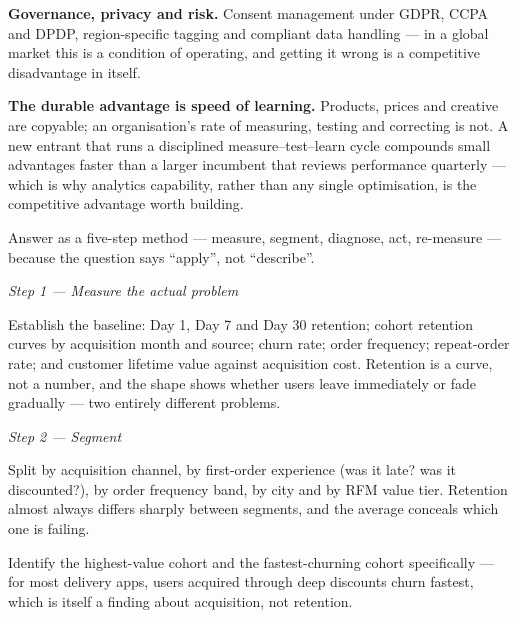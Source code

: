 \begin{qlist}
\begin{apts}
\item \textbf{Governance, privacy and risk.} Consent management under GDPR,
      CCPA and DPDP, region-specific tagging and compliant data handling --- in
      a global market this is a condition of operating, and getting it wrong is
      a competitive disadvantage in itself.
\item \textbf{The durable advantage is speed of learning.} Products, prices and
      creative are copyable; an organisation's rate of measuring, testing and
      correcting is not. A new entrant that runs a disciplined
      measure--test--learn cycle compounds small advantages faster than a larger
      incumbent that reviews performance quarterly --- which is why analytics
      capability, rather than any single optimisation, is the competitive
      advantage worth building.
\end{apts}

Answer as a five-step method --- measure, segment, diagnose, act, re-measure ---
because the question says ``apply'', not ``describe''.

\textit{Step 1 --- Measure the actual problem}
\begin{apts}
\item Establish the baseline: Day 1, Day 7 and Day 30 retention; cohort
      retention curves by acquisition month and source; churn rate; order
      frequency; repeat-order rate; and customer lifetime value against
      acquisition cost. Retention is a curve, not a number, and the shape shows
      whether users leave immediately or fade gradually --- two entirely
      different problems.
\end{apts}

\textit{Step 2 --- Segment}
\begin{apts}\setcounter{enumi}{1}
\item Split by acquisition channel, by first-order experience (was it late? was
      it discounted?), by order frequency band, by city and by RFM value tier.
      Retention almost always differs sharply between segments, and the average
      conceals which one is failing.
\item Identify the highest-value cohort and the fastest-churning cohort
      specifically --- for most delivery apps, users acquired through deep
      discounts churn fastest, which is itself a finding about acquisition, not
      retention.
\end{apts}


\end{qlist}
